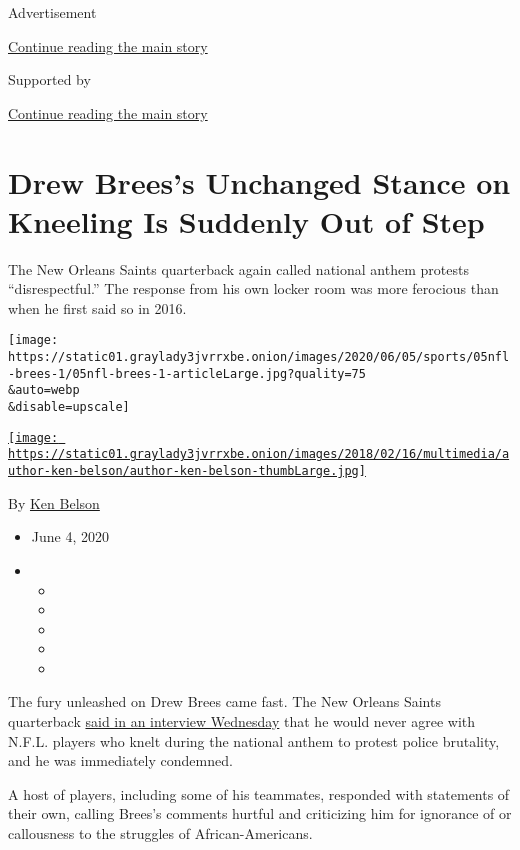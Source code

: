Advertisement

\protect\hyperlink{after-top}{Continue reading the main story}

Supported by

\protect\hyperlink{after-sponsor}{Continue reading the main story}

\hypertarget{drew-breess-unchanged-stance-on-kneeling-is-suddenly-out-of-step}{%
\section{Drew Brees's Unchanged Stance on Kneeling Is Suddenly Out of
Step}\label{drew-breess-unchanged-stance-on-kneeling-is-suddenly-out-of-step}}

The New Orleans Saints quarterback again called national anthem protests
``disrespectful.'' The response from his own locker room was more
ferocious than when he first said so in 2016.

\texttt{[image: https://static01.graylady3jvrrxbe.onion/images/2020/06/05/sports/05nfl-brees-1/05nfl-brees-1-articleLarge.jpg?quality=75\\\&auto=webp\\\&disable=upscale]}

\href{https://www.nytimes3xbfgragh.onion/by/ken-belson}{\texttt{[image: https://static01.graylady3jvrrxbe.onion/images/2018/02/16/multimedia/author-ken-belson/author-ken-belson-thumbLarge.jpg]}}

By \href{https://www.nytimes3xbfgragh.onion/by/ken-belson}{Ken Belson}

\begin{itemize}
\item
  June 4, 2020
\item
  \begin{itemize}
  \item
  \item
  \item
  \item
  \item
  \end{itemize}
\end{itemize}

The fury unleashed on Drew Brees came fast. The New Orleans Saints
quarterback
\href{https://twitter.com/YahooFinance/status/1268206174073126915?s=20}{said
in an interview Wednesday} that he would never agree with N.F.L. players
who knelt during the national anthem to protest police brutality, and he
was immediately condemned.

A host of players, including some of his teammates, responded with
statements of their own, calling Brees's comments hurtful and
criticizing him for ignorance of or callousness to the struggles of
African-Americans.

